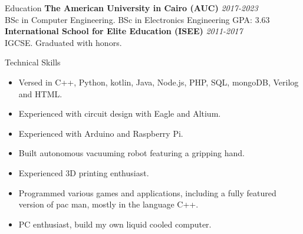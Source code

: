 \documentclass{resume}
\begin{document}
\begin{small}
	
	\begin{rSection}{Education}
		{\bf The American University in Cairo (AUC)} \hfill {\em 2017-2023} \\
		BSc in Computer Engineering. BSc in Electronics Engineering GPA: 3.63\\
		{\bf International School for Elite Education (ISEE)} \hfill {\em 2011-2017}
		\\ IGCSE. Graduated with honors.
	\end{rSection}
	
	\begin{rSection}{Technical Skills}
		\begin{itemize}
			\itemsep-0.5em
			\item Versed in C++, Python, kotlin, Java, Node.js, PHP, SQL, mongoDB, Verilog and HTML.
			\item Experienced with circuit design with Eagle and Altium.
			\item Experienced with Arduino and Raspberry Pi.
			\item Built autonomous vacuuming robot featuring a gripping hand.
			\item Experienced 3D printing enthusiast.
			\item Programmed various games and applications, including a fully featured version of pac man, mostly in the language C++.
			\item PC enthusiast, build my own liquid cooled computer.
		\end{itemize}
	\end{rSection}
	

\end{small}
\end{document}
